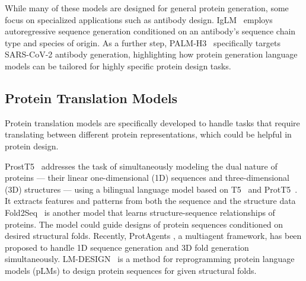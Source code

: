 While many of these models are designed for general protein generation, some focus on specialized applications such as antibody design. IgLM~\cite{shuai2023iglm} employs autoregressive sequence generation conditioned on an antibody's sequence chain type and species of origin. %
As a further step, PALM-H3~\cite{he2024novo} specifically targets SARS-CoV-2 antibody generation, highlighting how protein generation language models can be tailored for highly specific protein design tasks.


\subsection{Protein Translation Models}


Protein translation models are specifically developed to handle tasks that require translating between different protein representations, which could be helpful in protein design. 

ProstT5~\cite{heinzinger2023bilingual} addresses the task of simultaneously modeling the dual nature of proteins — their linear one-dimensional (1D) sequences and three-dimensional (3D) structures — using a bilingual language model based on T5~\cite{raffel2020exploring} and ProtT5~\cite{pokharel2022improving}. It extracts features and patterns from both the sequence and the structure data %
Fold2Seq~\cite{cao2021fold2seq} is another model that learns structure-sequence relationships of proteins. %
The model could guide designs of protein sequences conditioned on desired structural folds. Recently, ProtAgents \cite{ghafarollahi2024protagents}, a multiagent framework, has been proposed to handle 1D sequence generation and 3D fold generation simultaneously. LM-DESIGN~\citep{10.5555/3618408.3620189} is a method for reprogramming protein language models (pLMs) to design protein sequences for given structural folds.

